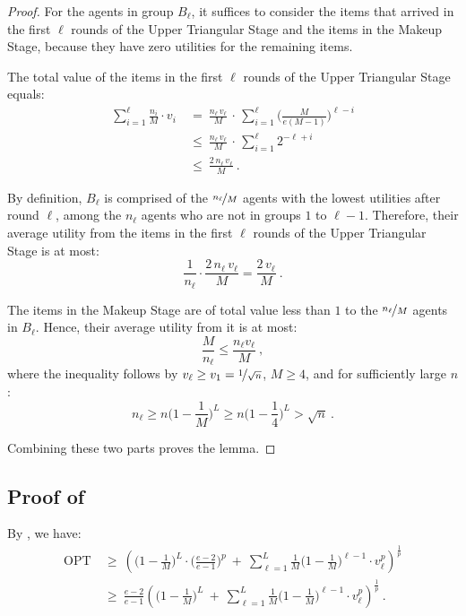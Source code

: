 \documentclass[11pt,letterpaper]{article}
\newcommand{\OPT}{\mathrm{OPT}}
\begin{document}
\begin{proof}
	For the agents in group $B_\ell$, it suffices to consider the items that arrived in the first $\ell$ rounds of the Upper Triangular Stage and the items in the Makeup Stage, because they have zero utilities for the remaining items.
	
	The total value of the items in the first $\ell$ rounds of the Upper Triangular Stage equals:
	\begin{align*}
		\sum_{i=1}^\ell \frac{n_i}{M} \cdot v_i
		&
		~=~ \frac{n_\ell\, v_\ell}{M} \,\cdot\, \sum_{i=1}^\ell \Big( \frac{M}{e(M-1)} \Big)^{\ell - i} \\
		&
		~\le~ \frac{n_\ell\, v_\ell}{M} \,\cdot\, \sum_{i=1}^\ell 2^{-\ell+i} 
		\tag{$M \ge 4$} \\
		&
		~\le~ \frac{2 \, n_\ell \, v_\ell}{M}
		~.
	\end{align*}
	
	By definition, $B_\ell$ is comprised of the $\nicefrac{n_\ell}{M}$ agents with the lowest utilities after round $\ell$, among the $n_\ell$ agents who are not in groups $1$ to $\ell - 1$.
	Therefore, their average utility from the items in the first $\ell$ rounds of the Upper Triangular Stage is at most:
	\[
	 	\frac{1}{n_\ell} \cdot \frac{2 \, n_\ell \, v_\ell}{M} = \frac{2\, v_\ell}{M}
		~.
	\]
	
	The items in the Makeup Stage are of total value less than $1$ to the $\nicefrac{n_\ell}{M}$ agents in $B_\ell$.
	Hence, their average utility from it is at most:
	\[
		\frac{M}{n_\ell}
		\le \frac{n_\ell v_\ell}{M}
		~,
	\]
	where the inequality follows by $v_\ell \ge v_1 = \nicefrac{1}{\sqrt{n}}$, 
    $M\geq 4$, and for sufficiently large $n$:
	\[
		n_\ell \ge n \Big(1-\frac{1}{M}\Big)^L \ge n \Big(1-\frac{1}{4}\Big)^L > \sqrt{n}
		~.
	\] 

	
	Combining these two parts proves the lemma.
\end{proof}




\subsection{Proof of }

By , we have:
\begin{align*}
	\OPT
	&
	~\ge~ 
	\left( \Big(1-\frac{1}{M}\Big)^L \cdot \Big(\frac{e-2}{e-1}\Big)^p ~+~ \sum_{\ell=1}^L \frac{1}{M} \Big(1 - \frac{1}{M}\Big)^{\ell-1} \cdot v_\ell^p \right)^{\frac{1}{p}} \\
	&
	~\ge~
	\frac{e-2}{e-1}
	\left( \Big(1-\frac{1}{M}\Big)^L ~+~ \sum_{\ell=1}^L \frac{1}{M} \Big(1 - \frac{1}{M}\Big)^{\ell-1} \cdot v_\ell^p \right)^{\frac{1}{p}}
	~.
\end{align*}
\end{document}
